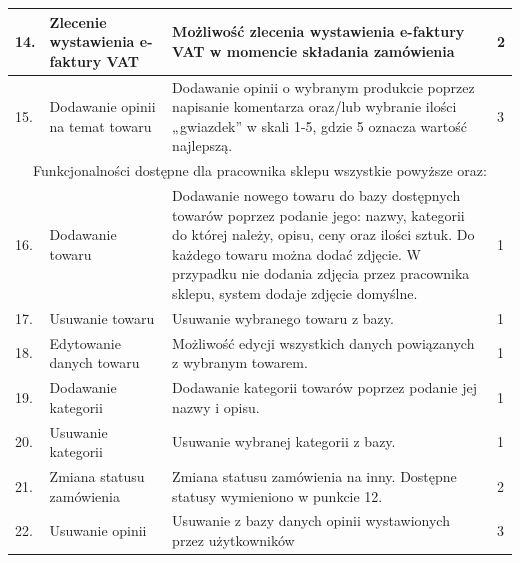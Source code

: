 \documentclass[10pt,a4paper]{article}
\begin{document}
\begin{longtable}{| m{0.5cm} | m{4cm} | p{6cm} | m{1.5cm} |}
			14.& Zlecenie wystawienia e-faktury VAT    & Możliwość zlecenia wystawienia e-faktury VAT 
														 w momencie składania zamówienia				& 2\\ \hline
			15.& Dodawanie opinii na temat towaru	   & Dodawanie opinii o wybranym produkcie poprzez 
														 napisanie komentarza oraz/lub wybranie 
														 ilości „gwiazdek” w skali 1-5,
														 gdzie 5 oznacza wartość najlepszą.				& 3\\ \hline
			 \multicolumn{4}{|c|}{Funkcjonalności dostępne dla pracownika sklepu
			 					  wszystkie powyższe oraz:}\\ \hline
			16.& Dodawanie towaru					   & Dodawanie nowego towaru do bazy dostępnych
			 											 towarów poprzez podanie jego: nazwy,
			 											 kategorii do której należy, opisu,
			 											 ceny oraz ilości sztuk. 
			 											 Do każdego towaru można dodać zdjęcie. 
			 											 W przypadku nie dodania zdjęcia przez pracownika
			 											 sklepu, system dodaje zdjęcie domyślne.		& 1\\ \hline
			17.& Usuwanie towaru					   & Usuwanie wybranego towaru z bazy.				& 1\\ \hline
			18.& Edytowanie danych towaru			   & Możliwość edycji wszystkich danych powiązanych
														 z wybranym towarem.							& 1\\ \hline
			19.& Dodawanie kategorii				   & Dodawanie kategorii towarów poprzez 
														 podanie jej nazwy i opisu.						& 1\\ \hline
			20.& Usuwanie kategorii					   & Usuwanie wybranej kategorii z bazy.			& 1\\ \hline
			21.& Zmiana statusu zamówienia			   & Zmiana statusu zamówienia na inny. 
														 Dostępne statusy wymieniono w punkcie 12.		& 2\\ \hline
			22.&Usuwanie opinii 					   & Usuwanie z bazy danych opinii wystawionych
														 przez użytkowników								& 3\\ \hline
														 

\end{longtable}
\end{document}
